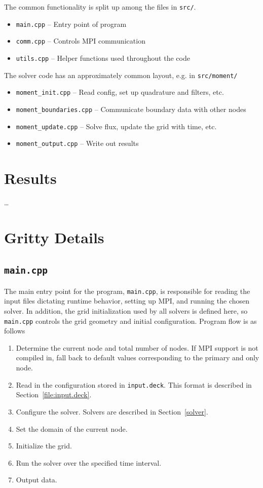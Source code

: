 \documentclass{article}
\newcommand{\main}{\texttt{main.cpp}\xspace}
\newcommand{\inputdeck}{\texttt{input.deck}\xspace}
\begin{document}
The common functionality is split up among the files in \texttt{src/}.
\begin{itemize}
 \item \texttt{main.cpp} -- Entry point of program
 \item \texttt{comm.cpp} -- Controls MPI communication
 \item \texttt{utils.cpp} -- Helper functions used throughout the code
 \end{itemize}
The solver code has an approximately common layout, e.g. in \texttt{src/moment/}
\begin{itemize}
 \item \texttt{moment\_init.cpp} -- Read config, set up quadrature and filters, etc.
 \item \texttt{moment\_boundaries.cpp} -- Communicate boundary data with other nodes
 \item \texttt{moment\_update.cpp} -- Solve flux, update the grid with time, etc.
 \item \texttt{moment\_output.cpp} -- Write out results
\end{itemize}

\section{Results}
\dots

\clearpage
\appendix
\section{Gritty Details}
\subsection{\main}
\label{src:main.cpp}
The main entry point for the program, \main, is responsible for reading the input
files dictating runtime behavior, setting up MPI, and running the chosen solver.
In addition, the grid initialization used by all solvers is defined here, so \main
controls the grid geometry and initial configuration. Program flow is as follows
\begin{enumerate}
    \item Determine the current node and total number of nodes. If MPI support is not
    compiled in, fall back to default values corresponding to the primary and
    only node.
    \item Read in the configuration stored in \inputdeck. This format is
    described in Section~\ref{file:input.deck}.
    \item Configure the solver. Solvers are described in Section~\ref{solver}.
    \item Set the domain of the current node.
    \item Initialize the grid.
    \item Run the solver over the specified time interval.
    \item Output data.
\end{enumerate}
\end{document}
